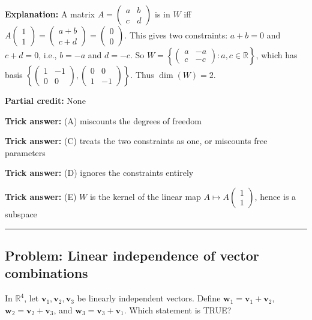 \documentclass[12pt]{amsart}
\newcommand{\divider}{
  \vspace{-1em}
  \noindent
  \raisebox{-0.15ex}{\textbullet}%
  \hspace{0.5em}%
  \rule[0.5ex]{0.95\textwidth}{1.0pt}%
  \hspace{0.5em}%
  \raisebox{-0.15ex}{\textbullet}%
  \vspace{0em}
}
\begin{document}
\textbf{Explanation:} A matrix $A = \begin{pmatrix} a & b \\ c & d \end{pmatrix}$ is in $W$ iff $A\begin{pmatrix}1\\1\end{pmatrix} = \begin{pmatrix}a+b\\c+d\end{pmatrix} = \begin{pmatrix}0\\0\end{pmatrix}$. This gives two constraints: $a + b = 0$ and $c + d = 0$, i.e., $b = -a$ and $d = -c$. So $W = \left\{ \begin{pmatrix} a & -a \\ c & -c \end{pmatrix} : a, c \in \mathbb{R} \right\}$, which has basis $\left\{ \begin{pmatrix} 1 & -1 \\ 0 & 0 \end{pmatrix}, \begin{pmatrix} 0 & 0 \\ 1 & -1 \end{pmatrix} \right\}$. Thus $\dim(W) = 2$.

\textbf{Partial credit:} None

\textbf{Trick answer:} (A) miscounts the degrees of freedom

\textbf{Trick answer:} (C) treats the two constraints as one, or miscounts free parameters

\textbf{Trick answer:} (D) ignores the constraints entirely

\textbf{Trick answer:} (E) $W$ is the kernel of the linear map $A \mapsto A\begin{pmatrix}1\\1\end{pmatrix}$, hence is a subspace

\divider

\subsection*{Problem: Linear independence of vector combinations}

In $\mathbb{R}^4$, let $\mathbf{v}_1, \mathbf{v}_2, \mathbf{v}_3$ be linearly independent vectors. Define $\mathbf{w}_1 = \mathbf{v}_1 + \mathbf{v}_2$, $\mathbf{w}_2 = \mathbf{v}_2 + \mathbf{v}_3$, and $\mathbf{w}_3 = \mathbf{v}_3 + \mathbf{v}_1$. Which statement is TRUE?
\end{document}
